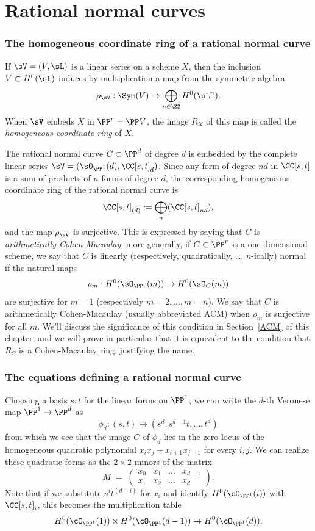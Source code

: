 \section{Rational normal curves}\label{rational normal curves section}

\subsubsection{The homogeneous coordinate ring of a rational normal curve}

If $\sV = (V,\sL)$ is a linear series on a scheme $X$, then the inclusion
$V\subset H^0(\sL)$ induces by multiplication a map from the symmetric algebra
$$
\rho_{\sV}: \Sym(V) \to  \bigoplus_{n\in \ZZ} H^0(\sL^n).
$$
When $\sV$ embeds $X$ in $\PP^r = \PP V$, the image $R_{X}$ of this map is called the \emph{homogeneous coordinate ring} of $X$. 

The rational normal curve $C\subset \PP^d$ of degree $d$ is embedded by the complete linear series
$\sV = (\sO_{\PP^1}(d), \CC[s,t]_d)$. Since any form of degree $nd$ in $\CC[s,t]$ is a sum of products of $n$ forms of degree $d$, 
the corresponding homogeneous coordinate ring of the rational normal curve is 
$$
\CC[s,t]_{(d)} := \bigoplus_n(\CC[s,t]_{nd}),
$$
and the map $\rho_{\sV}$ is surjective. This is expressed by saying
that $C$ is \emph{arithmetically Cohen-Macaulay}; more generally, if $C\subset \PP^r$ is 
a one-dimensional scheme, we say that $C$ is linearly (respectively, quadratically, \dots, $n$-ically) normal
if  the natural maps
$$
\rho_m: H^0(\sO_{\PP^r}(m)) \to H^0(\sO_{C}(m))
$$
are surjective for  $m=1$ (respectively $m=2,\dots, m=n$). We say that $C$ is arithmetically Cohen-Macaulay
(usually abbreviated ACM)
 when $\rho_m$ is surjective for all $m$. We'll discuss the significance of this condition in Section~\ref{ACM} of this chapter, and we will prove in particular that it is equivalent to the condition that $R_{C}$ is a Cohen-Macaulay ring, justifying
 the name.



\subsubsection{The equations defining a rational normal curve}

Choosing a basis $s,t$ for the linear forms on $\PP^1$, we can write the $d$-th Veronese map $\PP^{1}\to \PP^{d}$ as
$$
\phi_d : (s,t) \mapsto (s^d, s^{d-1}t,\dots, t^d)
$$
from which we see that the image $C$ of $\phi_d$ lies in the zero locus of the homogeneous quadratic polynomial $x_i x_j - x_{i+1}x_{j-1}$ for every $i,j$. We can realize these quadratic forms as the $2\times 2$ minors of the matrix
$$
M \; = \; \begin{pmatrix}
x_0 & x_1 & \dots & x_{d-1} \\
x_1 & x_2 & \dots & x_d
\end{pmatrix}.
$$
Note that if we substitute $s^it^{(d-i)}$ for $x_i$ and identify $H^0(\cO_{\PP^1}(i))$ with $\CC[s,t]_i$, this becomes the multiplication table
$$
H^0(\cO_{\PP^1}(1)) \times H^0(\cO_{\PP^1}(d-1)) \to H^0(\cO_{\PP^1}(d)).
$$



